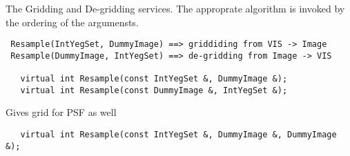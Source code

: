  The Gridding and De-gridding services.  
 The approprate algorithm is invoked by the ordering of the 
 argumensts.

\begin{verbatim}
 Resample(IntYegSet, DummyImage) ==> griddiding from VIS -> Image
 Resample(DummyImage, IntYegSet) ==> de-gridding from Image -> VIS

   virtual int Resample(const IntYegSet &, DummyImage &);
   virtual int Resample(const DummyImage &, IntYegSet &); 
\end{verbatim}

 Gives grid for PSF as well
\begin{verbatim}
   virtual int Resample(const IntYegSet &, DummyImage &, DummyImage &);
\end{verbatim}
